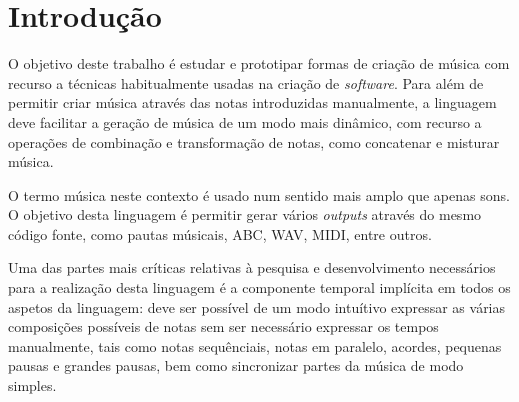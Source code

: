 \newcommand{\novathesis}{\emph{novathesis}}
\newcommand{\novathesisclass}{\texttt{novathesis.cls}}


\chapter{Introdução}
\label{cha:introducao}


O objetivo deste trabalho é estudar e prototipar formas de criação de música com recurso a técnicas habitualmente usadas na criação de \textit{software}. Para além de permitir criar música através das notas introduzidas manualmente, a linguagem deve facilitar a geração de música de um modo mais dinâmico, com recurso a operações de combinação e transformação de notas, como concatenar e misturar música.

O termo música neste contexto é usado num sentido mais amplo que apenas sons. O objetivo desta linguagem é permitir gerar vários \textit{outputs} através do mesmo código fonte, como pautas músicais, ABC, WAV, MIDI, entre outros.

Uma das partes mais críticas relativas à pesquisa e desenvolvimento necessários para a realização desta linguagem é a componente temporal implícita em todos os aspetos da linguagem: deve ser possível de um modo intuítivo expressar as várias composições possíveis de notas sem ser necessário expressar os tempos manualmente, tais como notas sequênciais, notas em paralelo, acordes, pequenas pausas e grandes pausas, bem como sincronizar partes da música de modo simples.

